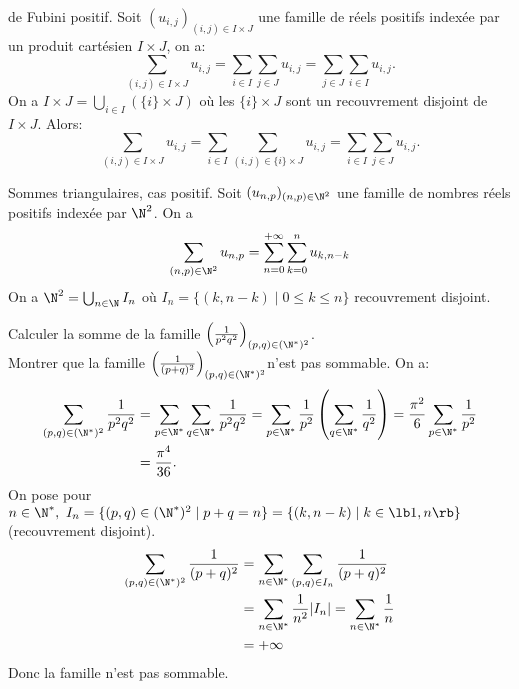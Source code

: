\documentclass[11pt]{article}
\begin{document}
\begin{thm}{de Fubini positif.}{}
    Soit $(u_{i,j})_{(i,j)\in I\times J}$ une famille de réels positifs indexée par un produit cartésien $I\times J$, on a:
    \begin{equation*}
        \sum_{(i,j)\in I\times J}u_{i,j}=\sum_{i\in I}\sum_{j\in J}u_{i,j}=\sum_{j\in J}\sum_{i\in I}u_{i,j}.
    \end{equation*}
    \tcblower
    On a $I\times J=\bigcup_{i\in I}(\{i\}\times J)$ où les $\{i\}\times J$ sont un recouvrement disjoint de $I\times J$. Alors:
    \begin{equation*}
        \sum_{(i,j)\in I\times J}u_{i,j}=\sum_{i\in I}\sum_{(i,j)\in\{i\}\times J}u_{i,j}=\sum_{i\in I}\sum_{j\in J}u_{i,j}.
    \end{equation*}
\end{thm}

\begin{ex}{Sommes triangulaires, cas positif.}{}
    Soit $(u_{n,p})_{(n,p)\in\N^2}$ une famille de nombres réels positifs indexée par $\N^2$. On a
    \begin{equation*}
        \sum_{(n,p)\in\N^2}u_{n,p}=\sum_{n=0}^{+\infty}\sum_{k=0}^nu_{k,n-k}
    \end{equation*}
    \tcblower
    On a $\N^2=\bigcup_{n\in\N}I_n$ où $I_n=\{(k,n-k)\mid0\leq k \leq n\}$ recouvrement disjoint.
\end{ex}

\begin{ex}{}{}
    Calculer la somme de la famille \Large$\left( \frac{1}{p^2q^2} \right)_{(p,q)\in(\N^*)^2}$\normalsize.\\
    Montrer que la famille \Large$\left( \frac{1}{(p+q)^2} \right)_{(p,q)\in(\N^*)^2}$\normalsize n'est pas sommable.
    \tcblower
    On a:
    \begin{align*}
        \sum_{(p,q)\in(\N^*)^2}\frac{1}{p^2q^2}&=\sum_{p\in\N^*}\sum_{q\in\N^*}\frac{1}{p^2q^2}=\sum_{p\in\N^*}\frac{1}{p^2}\left( \sum_{q\in\N^*}\frac{1}{q^2} \right) =\frac{\pi^2}{6}\sum_{p\in\N^*}\frac{1}{p^2}\\
        &=\frac{\pi^4}{36}.
    \end{align*}
    On pose pour $n\in\N^*,~ I_n=\{(p,q)\in(\N^*)^2\mid p+q=n\}=\{(k,n-k)\mid k\in\lb1,n\rb\}$ (recouvrement disjoint).
    \begin{align*}
        \sum_{(p,q)\in(\N^*)^2}\frac{1}{(p+q)^2}&=\sum_{n\in\N^*}\sum_{(p,q)\in I_n}\frac{1}{(p+q)^2}\\
        &=\sum_{n\in\N^*}\frac{1}{n^2}|I_n|=\sum_{n\in\N^*}\frac{1}{n}\\
        &=+\infty
    \end{align*}
    Donc la famille n'est pas sommable.
\end{ex}
\end{document}
